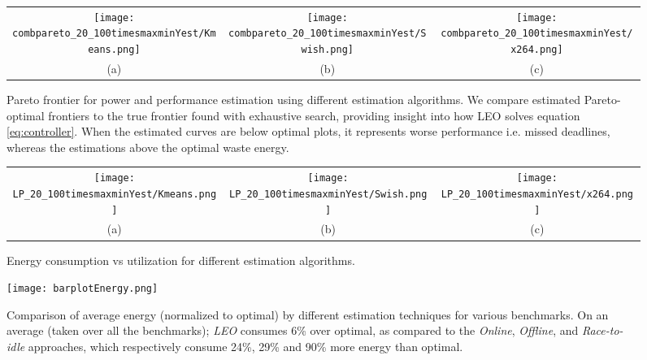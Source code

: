 \begin{figure*}
\begin{center}
\begin{tabular}[h]{ccc}\hspace*{-15pt}
	\texttt{[image: combpareto\_20\_100timesmaxminYest/Kmeans.png]}&
	\texttt{[image: combpareto\_20\_100timesmaxminYest/Swish.png]}&
	\texttt{[image: combpareto\_20\_100timesmaxminYest/x264.png]}	\\
	{(a)} &
	{(b)} &
	{(c)}
\end{tabular}
\caption{Pareto frontier for power and performance
  estimation using different estimation algorithms. We compare estimated Pareto-optimal frontiers to the true frontier found with exhaustive search, providing insight into how LEO solves equation \eqref{eq:controller}. When the estimated curves are below optimal plots, it represents worse performance i.e. missed deadlines, whereas the estimations above the optimal waste energy.
}
\label{fig:pareto}
\begin{tabular}[h]{ccc}\hspace*{-15pt}
	\texttt{[image: LP\_20\_100timesmaxminYest/Kmeans.png]}&
	\texttt{[image: LP\_20\_100timesmaxminYest/Swish.png]}&
	\texttt{[image: LP\_20\_100timesmaxminYest/x264.png]}\\
	{(a)} &
	{(b)} &
	{(c)}
\end{tabular}
\caption{Energy consumption vs utilization for different
  estimation algorithms.}
\label{fig:LP}
\end{center}
\end{figure*}


\begin{figure*}
\begin{center}
 \texttt{[image: barplotEnergy.png]}
 \caption{Comparison of average energy (normalized to
   optimal) by different estimation techniques for various benchmarks.
    On an average (taken over all the benchmarks);
   \textit{LEO} consumes 6\% over optimal, as compared to the
   \textit{Online}, \textit{Offline}, and \textit{Race-to-idle}
   approaches, which respectively consume 24\%, 29\% and 90\% more
   energy than optimal. }
\label{fig:barEnergy}
\end{center}
\end{figure*}


